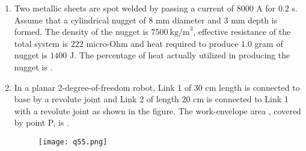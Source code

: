 \documentclass[journal,12pt,onecolumn]{IEEEtran}
\theoremstyle{remark}
\begin{document}
\begin{enumerate}
\item Two metallic sheets are spot welded by passing a current of $8000$ A for $0.2$ s. Assume that a cylindrical nugget of $8$ mm diameter and $3$ mm depth is formed. The density of the nugget is $7500~\text{kg/m}^3$, effective resistance of the total system is $222$ micro-Ohm and heat required to produce $1.0$ gram of nugget is $1400$ J. The percentage of heat actually utilized in producing the nugget is \underline{\hspace{2cm}}.

\hfill{}

\item In a planar 2-degree-of-freedom robot, Link 1 of $30$ cm length is connected to base by a revolute joint and Link 2 of length $20$ cm is connected to Link 1 with a revolute joint as shown in the figure. The work-envelope area , covered by point P, is \underline{\hspace{2cm}}.
\begin{figure}[h]
    \centering
    \texttt{[image: q55.png]}
    \caption*{}
    \label{fig:q55}
\end{figure}

\hfill{}

\end{enumerate}
\end{document}

